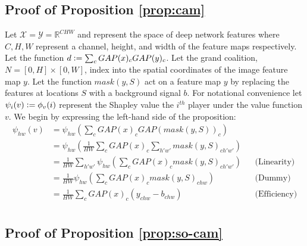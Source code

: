 \documentclass{article} %
\newcommand{\defeq}{\vcentcolon=}
\begin{document}
\subsection{Proof of Proposition \ref{prop:cam}}


 Let  $\mathcal{X} = \mathcal{Y} = \mathbb{R}^{CHW}$ and represent the space of deep network features where $C,H,W$ represent a channel, height, and width of the feature maps respectively. Let the function $d \defeq \sum_c GAP(x)_c GAP(y)_c$. Let the grand coalition, $N = [0,H] \times [0,W]$, index into the spatial coordinates of the image feature map $y$. Let the function $mask(y, S)$ act on a feature map $y$ by replacing the features at locations $S$ with a background signal $b$. For notational convenience let $\psi_i (v) \defeq \phi_v(i)$ represent the Shapley value the $i^{th}$ player under the value function $v$. We begin by expressing the left-hand side of the proposition:
 \begin{align*}
\psi_{hw}(v) &=  \psi_{hw} \left( \sum_c GAP(x)_c GAP(mask(y, S))_c \right)\\
&= \psi_{hw} \left( \frac{1}{HW} \sum_c GAP(x)_c \sum_{h'w'} mask(y, S)_{ch'w'} \right)\\
&= \frac{1}{HW} \sum_{h'w'} \psi_{hw} \left(  \sum_c GAP(x)_c  mask(y, S)_{ch'w'} \right) && \text{(Linearity)} \\
&= \frac{1}{HW} \psi_{hw} \left(  \sum_c GAP(x)_c  mask(y, S)_{chw} \right) && \text{(Dummy)} \\
&= \frac{1}{HW} \sum_c GAP(x)_c  (y_{chw} - b_{chw}) && \text{(Efficiency)}\\
\end{align*}




\subsection{Proof of Proposition \ref{prop:so-cam}}
\end{document}
